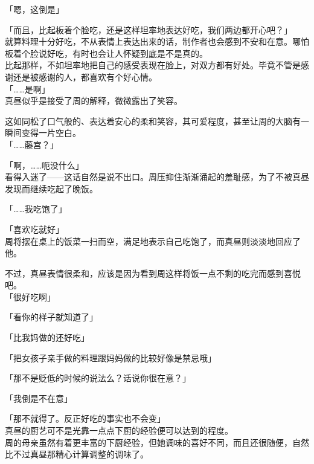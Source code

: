 「嗯，这倒是」

「而且，比起板着个脸吃，还是这样坦率地表达好吃，我们两边都开心吧？」\\

就算料理十分好吃，不从表情上表达出来的话，制作者也会感到不安和在意。哪怕板着个脸说好吃，有时也会让人怀疑到底是不是真的。\\

比起那样，不如坦率地把自己的感受表现在脸上，对双方都有好处。毕竟不管是感谢还是被感谢的人，都喜欢有个好心情。\\

「……是啊」\\

真昼似乎是接受了周的解释，微微露出了笑容。

这如同松了口气般的、表达着安心的柔和笑容，其可爱程度，甚至让周的大脑有一瞬间变得一片空白。\\

「……藤宫？」

「啊，……呃没什么」\\

看得入迷了——这话自然是说不出口。周压抑住渐渐涌起的羞耻感，为了不被真昼发现而继续吃起了晚饭。\\

\vspace{2\baselineskip}

「……我吃饱了」

「喜欢吃就好」\\

周将摆在桌上的饭菜一扫而空，满足地表示自己吃饱了，而真昼则淡淡地回应了他。

不过，真昼表情很柔和，应该是因为看到周这样将饭一点不剩的吃完而感到喜悦吧。\\

「很好吃啊」

「看你的样子就知道了」

「比我妈做的还好吃」

「把女孩子亲手做的料理跟妈妈做的比较好像是禁忌哦」

「那不是贬低的时候的说法么？话说你很在意？」

「我倒是不在意」

「那不就得了。反正好吃的事实也不会变」\\

真昼的厨艺可不是光靠一点点下厨的经验便可以达到的程度。\\

周的母亲虽然有着更丰富的下厨经验，但她调味的喜好不同，而且还很随便，自然比不过真昼那精心计算调整的调味了。\\

